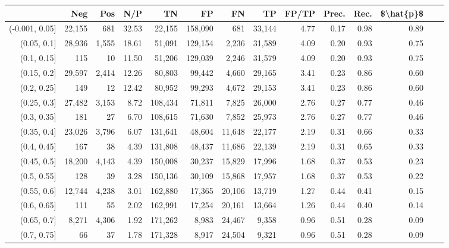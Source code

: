 \begin{tabular}{rrrrrrrrrrrrrr}
\toprule
{} &     Neg &    Pos &    N/P &       TN &       FP &      FN &      TP & FP/TP & Prec. &  Rec. & \$\textbackslash hat\{p\}\$ \\
\midrule
(-0.001, 0.05] &  22,155 &    681 &  32.53 &   22,155 &  158,090 &     681 &  33,144 &  4.77 &  0.17 &  0.98 &      0.89 \\
(0.05, 0.1]    &  28,936 &  1,555 &  18.61 &   51,091 &  129,154 &   2,236 &  31,589 &  4.09 &  0.20 &  0.93 &      0.75 \\
(0.1, 0.15]    &     115 &     10 &  11.50 &   51,206 &  129,039 &   2,246 &  31,579 &  4.09 &  0.20 &  0.93 &      0.75 \\
(0.15, 0.2]    &  29,597 &  2,414 &  12.26 &   80,803 &   99,442 &   4,660 &  29,165 &  3.41 &  0.23 &  0.86 &      0.60 \\
(0.2, 0.25]    &     149 &     12 &  12.42 &   80,952 &   99,293 &   4,672 &  29,153 &  3.41 &  0.23 &  0.86 &      0.60 \\
(0.25, 0.3]    &  27,482 &  3,153 &   8.72 &  108,434 &   71,811 &   7,825 &  26,000 &  2.76 &  0.27 &  0.77 &      0.46 \\
(0.3, 0.35]    &     181 &     27 &   6.70 &  108,615 &   71,630 &   7,852 &  25,973 &  2.76 &  0.27 &  0.77 &      0.46 \\
(0.35, 0.4]    &  23,026 &  3,796 &   6.07 &  131,641 &   48,604 &  11,648 &  22,177 &  2.19 &  0.31 &  0.66 &      0.33 \\
(0.4, 0.45]    &     167 &     38 &   4.39 &  131,808 &   48,437 &  11,686 &  22,139 &  2.19 &  0.31 &  0.65 &      0.33 \\
(0.45, 0.5]    &  18,200 &  4,143 &   4.39 &  150,008 &   30,237 &  15,829 &  17,996 &  1.68 &  0.37 &  0.53 &      0.23 \\
(0.5, 0.55]    &     128 &     39 &   3.28 &  150,136 &   30,109 &  15,868 &  17,957 &  1.68 &  0.37 &  0.53 &      0.22 \\
(0.55, 0.6]    &  12,744 &  4,238 &   3.01 &  162,880 &   17,365 &  20,106 &  13,719 &  1.27 &  0.44 &  0.41 &      0.15 \\
(0.6, 0.65]    &     111 &     55 &   2.02 &  162,991 &   17,254 &  20,161 &  13,664 &  1.26 &  0.44 &  0.40 &      0.14 \\
(0.65, 0.7]    &   8,271 &  4,306 &   1.92 &  171,262 &    8,983 &  24,467 &   9,358 &  0.96 &  0.51 &  0.28 &      0.09 \\
(0.7, 0.75]    &      66 &     37 &   1.78 &  171,328 &    8,917 &  24,504 &   9,321 &  0.96 &  0.51 &  0.28 &      0.09 \\

\end{tabular}
